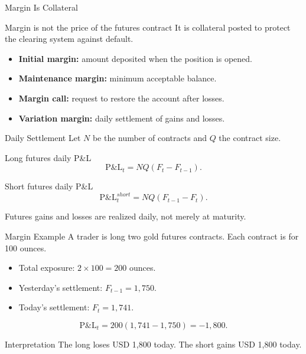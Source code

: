 \documentclass[aspectratio=169,11pt]{beamer}
\newcommand{\pnl}{\mathrm{P\&L}}
\begin{document}
\begin{frame}{Margin Is Collateral}
    \begin{block}{Margin is not the price of the futures contract}
        It is collateral posted to protect the clearing system against default.
    \end{block}

    \begin{itemize}
        \item \textbf{Initial margin:} amount deposited when the position is opened.
        \item \textbf{Maintenance margin:} minimum acceptable balance.
        \item \textbf{Margin call:} request to restore the account after losses.
        \item \textbf{Variation margin:} daily settlement of gains and losses.
    \end{itemize}
\end{frame}

\begin{frame}{Daily Settlement}
    Let $N$ be the number of contracts and $Q$ the contract size.

    \begin{block}{Long futures daily P\&L}
        \[
            \pnl_t = NQ(F_t-F_{t-1}).
        \]
    \end{block}

    \begin{block}{Short futures daily P\&L}
        \[
            \pnl_t^{short}=NQ(F_{t-1}-F_t).
        \]
    \end{block}

    Futures gains and losses are realized daily, not merely at maturity.
\end{frame}

\begin{frame}{Margin Example}
    A trader is long two gold futures contracts.
    Each contract is for 100 ounces.

    \begin{itemize}
        \item Total exposure: $2\times 100=200$ ounces.
        \item Yesterday's settlement: $F_{t-1}=1{,}750$.
        \item Today's settlement: $F_t=1{,}741$.
    \end{itemize}

    \[
        \pnl_t = 200(1{,}741-1{,}750)=-1{,}800.
    \]

    \begin{alertblock}{Interpretation}
        The long loses USD 1,800 today. The short gains USD 1,800 today.
    \end{alertblock}
\end{frame}
\end{document}
